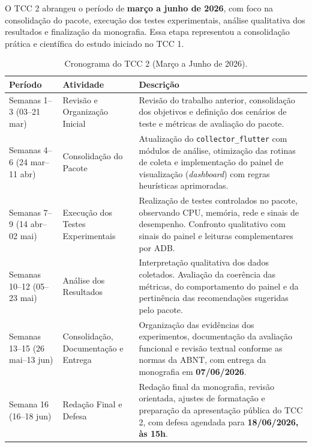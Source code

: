 O TCC 2 abrangeu o período de \textbf{março a junho de 2026}, com foco na consolidação do pacote, execução dos testes experimentais, análise qualitativa dos resultados e finalização da monografia.
Essa etapa representou a consolidação prática e científica do estudo iniciado no TCC 1.

\begin{table}[htbp]
\centering
\caption{Cronograma do TCC 2 (Março a Junho de 2026).}
\label{tab:cronograma-tcc2}
\small
\renewcommand{\arraystretch}{1.25}
\begin{tabular}{|p{2.7cm}|p{4.5cm}|p{6.3cm}|}
\hline
\textbf{Período} & \textbf{Atividade} & \textbf{Descrição} \\
\hline
Semanas 1--3 (03--21 mar) & Revisão e Organização Inicial & Revisão do trabalho anterior, consolidação dos objetivos e definição dos cenários de teste e métricas de avaliação do pacote. \\
\hline
Semanas 4--6 (24 mar--11 abr) & Consolidação do Pacote & Atualização do \texttt{collector\_flutter} com módulos de análise, otimização das rotinas de coleta e implementação do painel de visualização (\textit{dashboard}) com regras heurísticas aprimoradas. \\
\hline
Semanas 7--9 (14 abr--02 mai) & Execução dos Testes Experimentais & Realização de testes controlados no pacote, observando CPU, memória, rede e sinais de desempenho. Confronto qualitativo com sinais do painel e leituras complementares por ADB. \\
\hline
Semanas 10--12 (05--23 mai) & Análise dos Resultados & Interpretação qualitativa dos dados coletados. Avaliação da coerência das métricas, do comportamento do painel e da pertinência das recomendações sugeridas pelo pacote. \\
\hline
Semanas 13--15 (26 mai--13 jun) & Consolidação, Documentação e Entrega & Organização das evidências dos experimentos, documentação da avaliação funcional e revisão textual conforme as normas da ABNT, com entrega da monografia em \textbf{07/06/2026}. \\
\hline
Semana 16 (16--18 jun) & Redação Final e Defesa & Redação final da monografia, revisão orientada, ajustes de formatação e preparação da apresentação pública do TCC 2, com defesa agendada para \textbf{18/06/2026, às 15h}. \\
\hline
\end{tabular}
\end{table}
